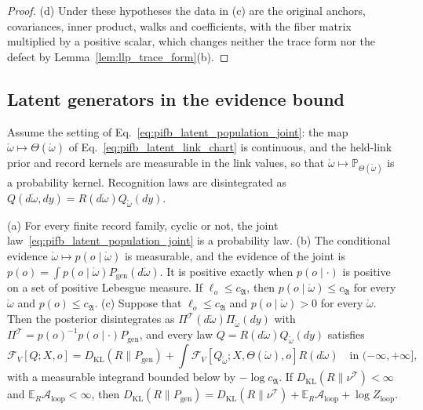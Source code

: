 \begin{proof}
(d) Under these hypotheses the data in (c) are the original anchors, covariances, inner product, walks and coefficients, with the fiber matrix multiplied by a positive scalar, which changes neither the trace form nor the defect by Lemma~\ref{lem:llp_trace_form}(b).
\end{proof}

\subsection{Latent generators in the evidence bound}\label{app:llp_decomposition}

Assume the setting of Eq.~\eqref{eq:pifb_latent_population_joint}: the map $\mathring\omega\mapsto\Theta(\mathring\omega)$ of Eq.~\eqref{eq:pifb_latent_link_chart} is continuous, and the held-link prior and record kernels are measurable in the link values, so that $\mathring\omega\mapsto\mathbb P_{\Theta(\mathring\omega)}$ is a probability kernel. Recognition laws are disintegrated as $Q(d\mathring\omega,dy)=R(d\mathring\omega)Q_{\mathring\omega}(dy)$.

\begin{proposition}\label{prop:llp_decomposition}
(a) For every finite record family, cyclic or not, the joint law~\eqref{eq:pifb_latent_population_joint} is a probability law.
(b) The conditional evidence $\mathring\omega\mapsto p(o\mid\mathring\omega)$ is measurable, and the evidence of the joint is $p(o)=\int p(o\mid\mathring\omega)P_{\mathrm{gen}}(d\mathring\omega)$. It is positive exactly when $p(o\mid\cdot)$ is positive on a set of positive Lebesgue measure. If $\ell_o\leq c_{\mathfrak A}$, then $p(o\mid\mathring\omega)\leq c_{\mathfrak A}$ for every $\mathring\omega$ and $p(o)\leq c_{\mathfrak A}$.
(c) Suppose that $\ell_o\leq c_{\mathfrak A}$ and $p(o\mid\mathring\omega)>0$ for every $\mathring\omega$. Then the posterior disintegrates as $\Pi^{\mathcal T}(d\mathring\omega)\Pi_{\mathring\omega}(dy)$ with $\Pi^{\mathcal T}=p(o)^{-1}p(o\mid\cdot)P_{\mathrm{gen}}$, and every law $Q=R(d\mathring\omega)Q_{\mathring\omega}(dy)$ satisfies
\begin{equation}
\mathcal F_V[Q;X,o]=D_{\mathrm{KL}}(R\|P_{\mathrm{gen}})+\int\mathcal F_V[Q_{\mathring\omega};X,\Theta(\mathring\omega),o]R(d\mathring\omega)
\quad\text{in }(-\infty,+\infty],
\label{eq:llp_decomposition}
\end{equation}
with a measurable integrand bounded below by $-\log c_{\mathfrak A}$. If $D_{\mathrm{KL}}(R\|\nu^{\mathcal T})<\infty$ and $\mathbb E_R\mathcal A_{\mathrm{loop}}<\infty$, then $D_{\mathrm{KL}}(R\|P_{\mathrm{gen}})=D_{\mathrm{KL}}(R\|\nu^{\mathcal T})+\mathbb E_R\mathcal A_{\mathrm{loop}}+\log Z_{\mathrm{loop}}$.
\end{proposition}

